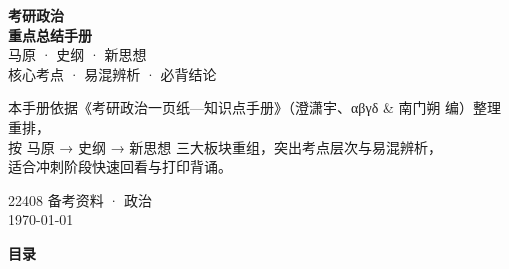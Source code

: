 \documentclass[11pt,a4paper]{ctexart}
\begin{document}
\begin{titlepage}
\centering
\vspace*{3.2cm}
{\Huge\bfseries\color{accent} 考研政治}\\[0.5cm]
{\Huge\bfseries\color{accent} 重点总结手册}\\[1.2cm]
{\large\color{rule} 马原 · 史纲 · 新思想}\\[0.35cm]
{\large\color{rule} 核心考点 · 易混辨析 · 必背结论}\\[3.2cm]

\begin{minipage}{0.78\linewidth}
\centering
\small\color{rule}
本手册依据《考研政治一页纸—知识点手册》（澄潇宇、αβγδ \& 南门朔 编）整理重排，\\
按 马原 → 史纲 → 新思想 三大板块重组，突出考点层次与易混辨析，\\
适合冲刺阶段快速回看与打印背诵。
\end{minipage}

\vfill
{\small\color{rule} 22408 备考资料 · 政治}\\[0.2cm]
{\small\color{rule} \today}
\end{titlepage}

\newpage
{}
\setcounter{page}{1}
{\centering\bfseries\Large\color{accent} 目\quad 录\par}
\vspace{0.6cm}
\makeatletter
{}
\makeatother

\newpage
{}
\setcounter{page}{1}




\end{document}
